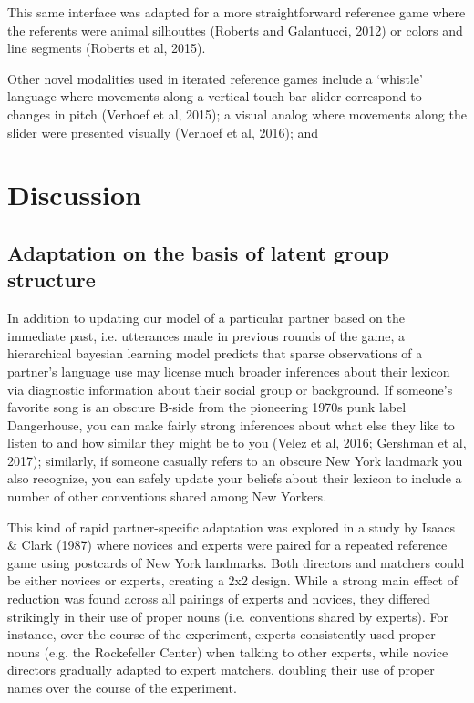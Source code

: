 \documentclass[11pt, floatsintext, man]{apa6}
\begin{document}
This same interface was adapted for a more straightforward reference game where the referents were animal silhouttes (Roberts and Galantucci, 2012) or colors and line segments (Roberts et al, 2015). 

Other novel modalities used in iterated reference games include a `whistle' language where movements along a vertical touch bar slider correspond to changes in pitch (Verhoef et al, 2015); a visual analog where movements along the slider were presented visually (Verhoef et al, 2016); and 

\section{Discussion}

\subsection{Adaptation on the basis of latent group structure}

In addition to updating our model of a particular partner based on the immediate past, i.e. utterances made in previous rounds of the game, a hierarchical bayesian learning model predicts that sparse observations of a partner's language use may license much broader inferences about their lexicon via diagnostic information about their social group or background. If someone's favorite song is an obscure B-side from the pioneering 1970s punk label Dangerhouse, you can make fairly strong inferences about what else they like to listen to and how similar they might be to you (Velez et al, 2016; Gershman et al, 2017); similarly, if someone casually refers to an obscure New York landmark you also recognize, you can safely update your beliefs about their lexicon to include a number of other conventions shared among New Yorkers. 

This kind of rapid partner-specific adaptation was explored in a study by Isaacs \& Clark (1987) where novices and experts were paired for a repeated reference game using postcards of New York landmarks. Both directors and matchers could be either novices or experts, creating a 2x2 design. While a strong main effect of reduction was found across all pairings of experts and novices, they differed strikingly in their use of proper nouns (i.e. conventions shared by experts). For instance, over the course of the experiment, experts consistently used proper nouns (e.g. the Rockefeller Center) when talking to other experts, while novice directors gradually adapted to expert matchers, doubling their use of proper names over the course of the experiment.
\end{document}
